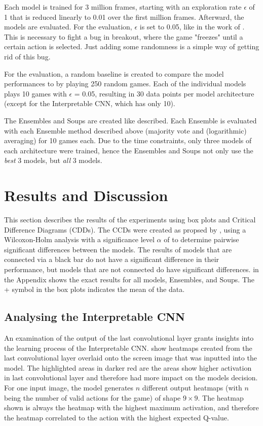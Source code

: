Each model is trained for 3 million frames, starting with an exploration rate $\epsilon$ of 1 that is reduced linearly to 0.01 over the first million frames. Afterward, the models are evaluated. For the evaluation, $\epsilon$ is set to 0.05, like in the work of \textcite{mnih_playing_2013}. This is necessary to fight a bug in breakout, where the game "freezes" until a certain action is selected. Just adding some randomness is a simple way of getting rid of this bug.

For the evaluation, a random baseline is created to compare the model performances to by playing 250 random games. Each of the individual models plays 10 games with $\epsilon$ = 0.05, resulting in 30 data points per model architecture (except for the Interpretable CNN, which has only 10).

The Ensembles and Soups are created like described. Each Ensemble is evaluated with each Ensemble method described above (majority vote and (logarithmic) averaging) for 10 games each. Due to the time constraints, only three models of each architecture were trained, hence the Ensembles and Soups not only use the \emph{best} 3 models, but \emph{all} 3 models.

\chapter{Results and Discussion}

This section describes the results of the experiments using box plots and Critical Difference Diagrams (CDDs). The CCDs were created as propsed by \textcite{ismail_fawaz_deep_2019}, using a Wilcoxon-Holm analysis with a significance level $\alpha$ of to determine pairwise significant differences between the models. The results of models that are connected via a black bar do not have a significant difference in their performance, but models that are not connected do have significant differences.  in the Appendix shows the exact results for all models, Ensembles, and Soups. The + symbol in the box plots indicates the mean of the data.


\section{Analysing the Interpretable CNN}

An examination of the output of the last convolutional layer grants insights into the learning process of the Interpretable CNN.  show heatmaps created from the last convolutional layer overlaid onto the screen image that was inputted into the model. The highlighted areas in darker red are the areas show higher activation in last convolutional layer and therefore had more impact on the models decision. For one input image, the model generates $n$ different output heatmaps (with $n$ being the number of valid actions for the game) of shape $9 \times 9$. The heatmap shown is always the heatmap with the highest maximum activation, and therefore the heatmap correlated to the action with the highest expected Q-value.

